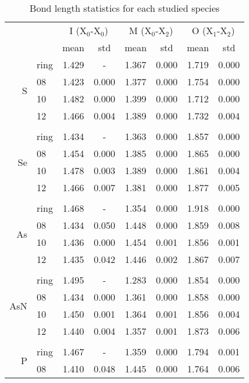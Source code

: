 \begin{table}
    \centering
    \caption[Bond length study]{Bond length statistics for each studied species}
    \begin{tabular}{@{}rlcccccc@{}}
        \toprule
        && \multicolumn{2}{c}{I (X$_0$-X$_0$)} & \multicolumn{2}{c}{M (X$_0$-X$_2$)} & \multicolumn{2}{c}{O (X$_1$-X$_2$)} \\
        && mean & std & mean & std & mean & std \\
        \midrule
        \multirow{4}{*}{S} & ring & 1.429 & - & 1.367 & 0.000 & 1.719 & 0.000 \\
        & 08 & 1.423 & 0.000 & 1.377 & 0.000 & 1.754 & 0.000 \\
        & 10 & 1.482 & 0.000 & 1.399 & 0.000 & 1.712 & 0.000 \\
        & 12 & 1.466 & 0.004 & 1.389 & 0.000 & 1.732 & 0.004 \\
        \\
        \multirow{4}{*}{Se} & ring & 1.434 & - & 1.363 & 0.000 & 1.857 & 0.000 \\
        & 08 & 1.454 & 0.000 & 1.385 & 0.000 & 1.865 & 0.000 \\
        & 10 & 1.478 & 0.003 & 1.389 & 0.000 & 1.861 & 0.004 \\
        & 12 & 1.466 & 0.007 & 1.381 & 0.000 & 1.877 & 0.005 \\
        \\
        \multirow{4}{*}{As} & ring & 1.468 & - & 1.354 & 0.000 & 1.918 & 0.000 \\
        & 08 & 1.434 & 0.050 & 1.448 & 0.000 & 1.859 & 0.008 \\
        & 10 & 1.436 & 0.000 & 1.454 & 0.001 & 1.856 & 0.001 \\
        & 12 & 1.435 & 0.042 & 1.446 & 0.002 & 1.867 & 0.007 \\
        \\
        \multirow{4}{*}{AsN} & ring & 1.495 & - & 1.283 & 0.000 & 1.854 & 0.000 \\
        & 08 & 1.434 & 0.000 & 1.361 & 0.000 & 1.858 & 0.000 \\
        & 10 & 1.450 & 0.001 & 1.364 & 0.001 & 1.856 & 0.004 \\
        & 12 & 1.440 & 0.004 & 1.357 & 0.001 & 1.873 & 0.006 \\
        \\
        \multirow{4}{*}{P} & ring & 1.467 & - & 1.359 & 0.000 & 1.794 & 0.001 \\
        & 08 & 1.410 & 0.048 & 1.445 & 0.000 & 1.764 & 0.006 \\

\end{tabular}
\end{table}
